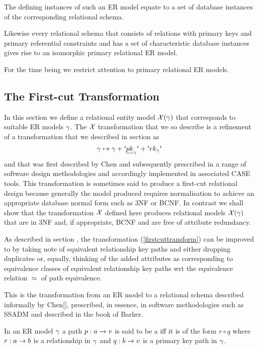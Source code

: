 The defining instances of such an ER model equate to a set of database instances of the corresponding relational schema.

Likewise every relational schema that consists of relations with primary keys and primary referential constraints and has a set of characteristic database instances gives rise to an isomorphic primary relational ER model. 

For the time being we restrict attention to primary relational ER models. 

\subsection{The First-cut Transformation}

In this section we define a relational  entity model $\mathcal{X}(\gamma)$ that corresponds
to suitable ER models $\gamma$. The $\mathcal{X}$ transformation that we so describe is a refinement
of a transformation that we described in  section  as
\begin{equation}
\label{firstcuttransform}
\gmodel \mapsto \gmodel + \sq{\underline{pk}_\gmodel} + \sq{\rkp}
\end{equation}
and that was first described by Chen and subsequently prescribed in a range of software design methodologies and accordingly implemented in associated CASE tools. This transformation is sometimes said to produce a first-cut relational design because generally the model produced requires normalisation to achieve an appropriate database normal form such as 3NF or BCNF. 
In contrast we shall show that the transformation $\mathcal{X}$ defined here produces relational models $\mathcal{X}(\gamma)$ that are in 3NF and, if appropriate, BCNF and are free of attribute redundancy.
 
As described in section , the transformation (\ref{firstcuttransform}) can be improved to by taking note of equivalent relationship key paths and
either dropping duplicates or, equally, thinking of the added attributes as corresponding to equivalence classes of 
equivalent relationship key paths wrt the equivalence relation $\simeq$ of path equivalence. 

This is the transformation from an ER model to a relational schema described informally by Chen[\cite{???}], prescribed, in essence, in software methodologies such as SSADM and described 
in the book of Barker.

\begin{definition}
In an ER model $\gamma$ a path $p: a \rightarrow v$ is said to be a  iff it is of the form $r \circ q$ where  $r : a \rightarrow b$ is a relationship in $\gamma$ and $q: b \rightarrow v$ is a primary key path in $\gamma$.
\end{definition}

